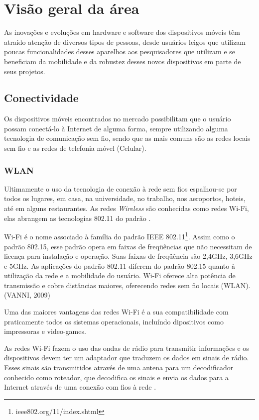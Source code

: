 \chapter{Visão geral da área}

As inovações e evoluções em hardware e software dos dispositivos móveis têm atraído atenção de diversos tipos de pessoas, desde usuários leigos que utilizam poucas funcionalidades desses aparelhos aos pesquisadores que utilizam e se beneficiam da mobilidade e da robustez desses novos dispositivos em parte de seus projetos.

\section{Conectividade}
Os dispositivos móveis encontrados no mercado possibilitam que o usuário possam conectá-lo à Internet de alguma forma, sempre utilizando alguma tecnologia de comunicação sem fio, sendo que as mais comuns são as redes locais sem fio  e as redes de telefonia móvel (Celular).
\subsection{WLAN}
Ultimamente o uso da tecnologia de conexão à rede sem fios espalhou-se por todos os lugares, em casa, na universidade, no trabalho, nos aeroportos, hoteis, até em alguns restaurantes.
As redes \textit{Wireless} são conhecidas como redes Wi-Fi, elas abrangem as tecnologias 802.11 do padrão .
\begin{citacao}
Wi-Fi é o nome associado à família do padrão IEEE 802.11\footnote{ieee802.org/11/index.shtml}. Assim como o
padrão 802.15, esse padrão opera em faixas de freqüências que não necessitam de licença para instalação e operação. Suas faixas de freqüência são 2,4GHz, 3,6GHz e 5GHz. As aplicações do padrão 802.11 diferem do padrão 802.15 quanto à utilização da rede e a mobilidade do usuário. Wi-Fi oferece alta potência de transmissão e cobre distâncias maiores, oferecendo redes sem fio locais (WLAN). (VANNI, 2009)
\end{citacao}
Uma das maiores vantagens das redes Wi-Fi é a sua compatibilidade com praticamente todos os sistemas operacionais, incluíndo dipositivos como impressoras e video-games.

As redes Wi-Fi fazem o uso das ondas de rádio para transmitir informações e os dispositivos devem ter um adaptador que traduzem os dados em sinais de rádio. Esses sinais são transmitidos através de uma antena para um decodificador conhecido como roteador, que decodifica os sinais e envia os dados para a Internet através de uma conexão com fios à rede .

